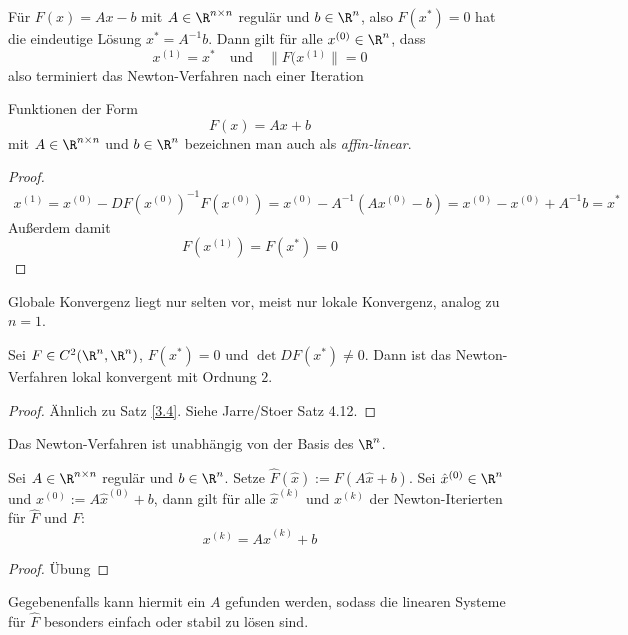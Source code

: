 \documentclass[11pt]{scrartcl}
\begin{document}
\begin{lem} \label{3.22}
	Für $F(x) = Ax - b$ mit $A\in \R^{n\times n}$ regulär und $b\in \R^n$, also $F(x^*)=0$ hat die eindeutige Lösung $x^* = A^{-1}b$.
	Dann gilt für alle $x^{(0)} \in \R^n$, dass
	\[
		x^{(1)} = x^*
		\quad\text{und}\quad
		\|F(x^{(1)}\| = 0
	\]
	also terminiert das Newton-Verfahren nach einer Iteration
	\begin{note}
		Funktionen der Form
		\[
			F(x) = Ax + b
		\]
		mit $A\in \R^{n\times n}$ und $b\in \R^n$ bezeichnen man auch als \emph{affin-linear}.
	\end{note}
	\begin{proof}
		\begin{align*}
			x^{(1)} = x^{(0)} - DF(x^{(0)})^{-1}F(x^{(0)}) = x^{(0)} - A^{-1} (Ax^{(0)}-b) = x^{(0)} - x^{(0)} + A^{-1}b = x^*
		\end{align*}
		Außerdem damit
		\[
			F(x^{(1)}) = F(x^*) = 0
		\]
	\end{proof}
	\begin{note}
		Globale Konvergenz liegt nur selten vor, meist nur lokale Konvergenz, analog zu $n=1$.
	\end{note}
\end{lem}

\begin{st} \label{3.23}
	Sei $F \in C^2(\R^n, \R^n)$, $F(x^*) = 0$ und $\det DF(x^*) \neq 0$.
	Dann ist das Newton-Verfahren lokal konvergent mit Ordnung $2$.
	\begin{proof}
		Ähnlich zu Satz \ref{3.4}.
		Siehe Jarre/Stoer Satz 4.12.
	\end{proof}
\end{st}

Das Newton-Verfahren ist unabhängig von der Basis des $\R^n$.

\begin{st} \label{3.24}
	Sei $A\in \R^{n\times n}$ regulär und $b \in \R^n$.
	Setze $\hat F(\hat x) := F(A\hat x+b)$.
	Sei $\hat x^{(0)} \in \R^n$ und $x^{(0)} := A\hat x^{(0)} + b$, dann gilt für alle $\hat x^{(k)}$ und $x^{(k)}$ der Newton-Iterierten für $\hat F$ und $F$:
	\[
		x^{(k)} = A \hat x^{(k)} + b
	\]
	\begin{proof}
		Übung
	\end{proof}
	\begin{note}
		Gegebenenfalls kann hiermit ein $A$ gefunden werden, sodass die linearen Systeme für $\hat F$ besonders einfach oder stabil zu lösen sind.
	\end{note}
\end{st}
\end{document}
